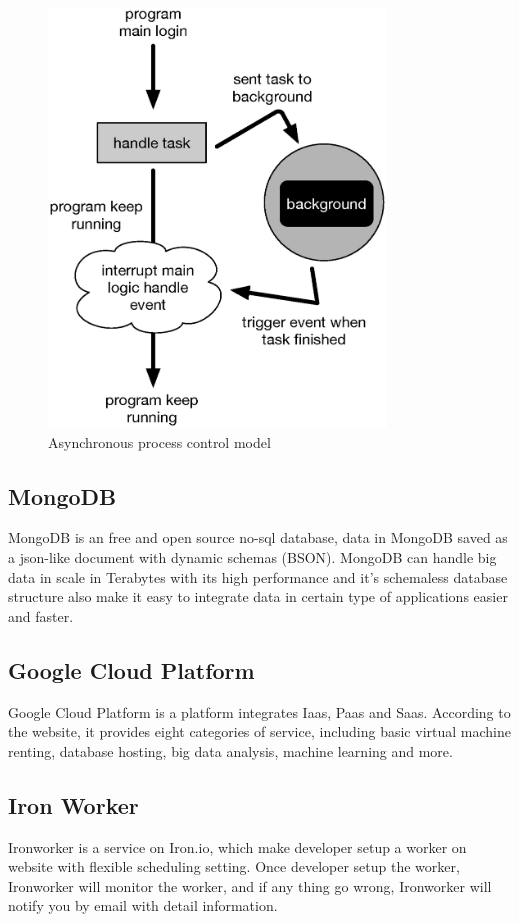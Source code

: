 \begin{figure}[H]
    \centering
    \includegraphics[width = 0.8\textwidth]{fig/asynchonous-process.eps}
    \caption{Asynchronous process control model}
    \label{fig:asynchornous}
\end{figure}


\subsection{MongoDB}
MongoDB \cite{mongodb} is an free and open source no-sql database, data in MongoDB saved as a json-like document with dynamic schemas (BSON).
MongoDB can handle big data in scale in Terabytes with its high performance and it's schemaless database structure also make it easy to integrate data in certain type of applications easier and faster.

\subsection{Google Cloud Platform}
Google Cloud Platform \cite{googlecloud} is a platform integrates Iaas, Paas and Saas.
According to the website, it provides eight categories of service, including basic virtual machine renting, database hosting, big data analysis, machine learning and more.

\subsection{Iron Worker}
Ironworker \cite{ironworker} is a service on Iron.io, which make developer setup a worker on website with flexible scheduling setting.
Once developer setup the worker, Ironworker will monitor the worker, and if any thing go wrong, Ironworker will notify you by email with detail information.

